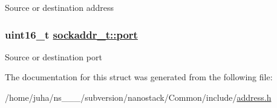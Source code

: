 Source or destination address \hypertarget{structsockaddr__t_b4544bc9ff62d1a9facbdf7a3ffcc8d2}{
\subsubsection[port]{\setlength{\rightskip}{0pt plus 5cm}uint16\_\-t \hyperlink{structsockaddr__t_b4544bc9ff62d1a9facbdf7a3ffcc8d2}{sockaddr\_\-t::port}}}
\label{structsockaddr__t_b4544bc9ff62d1a9facbdf7a3ffcc8d2}


Source or destination port 

The documentation for this struct was generated from the following file:\begin{CompactItemize}
\item 
/home/juha/ns\_\_\_/subversion/nanostack/Common/include/\hyperlink{address_8h}{address.h}\end{CompactItemize}
